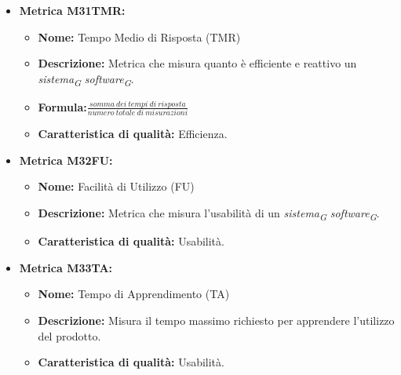 \begin{itemize}
            \item \hypertarget{item:M31TMR}{\textbf{Metrica M31TMR:}}
            \begin{minipage}[t]{0.9\textwidth}
                  \begin{itemize}
                      \item \textbf{Nome:} Tempo Medio di Risposta (TMR)
                      \item \textbf{Descrizione:} Metrica che misura quanto è efficiente e reattivo un \textit{sistema}\textsubscript{\textit{G}} \textit{software}\textsubscript{\textit{G}}.
                      \item \textbf{Formula:}$\frac{somma \ dei \ tempi \ di \ risposta}{numero \ totale \ di \ misurazioni}$
                      \item \textbf{Caratteristica di qualità:} Efficienza.
                    \end{itemize}
                \end{minipage}  


            \item \hypertarget{item:M32FU}{\textbf{Metrica M32FU:}}
            \begin{minipage}[t]{0.9\textwidth}
                  \begin{itemize}
                      \item \textbf{Nome:} Facilità di Utilizzo (FU)
                      \item \textbf{Descrizione:} Metrica che misura l'usabilità di un \textit{sistema}\textsubscript{\textit{G}} \textit{software}\textsubscript{\textit{G}}.
                      \item \textbf{Caratteristica di qualità:} Usabilità.
                    \end{itemize}
                \end{minipage}

            \item \hypertarget{item:M33TA}{\textbf{Metrica M33TA:}}
            \begin{minipage}[t]{0.9\textwidth}
                  \begin{itemize}
                      \item \textbf{Nome:} Tempo di Apprendimento (TA)
                      \item \textbf{Descrizione:} Misura il tempo massimo richiesto per apprendere l'utilizzo del prodotto.
                      \item \textbf{Caratteristica di qualità:} Usabilità.
                    \end{itemize}
                \end{minipage}


\end{itemize}
